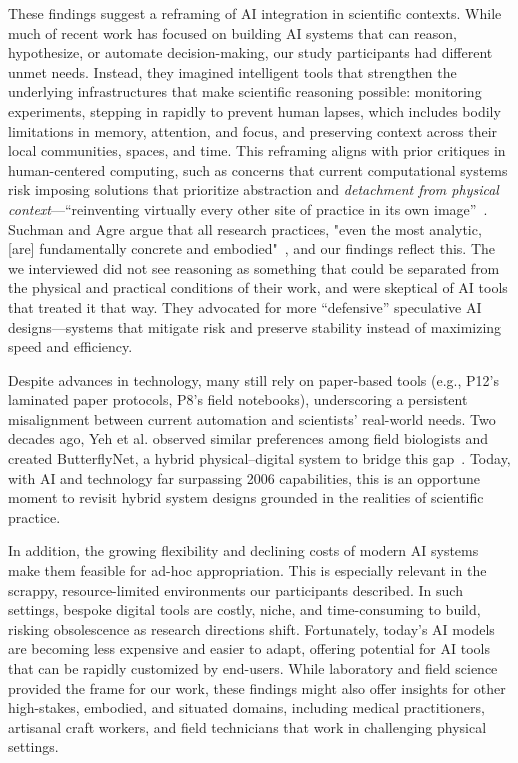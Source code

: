 These findings suggest a reframing of AI integration in scientific contexts. While much of recent work has focused on building AI systems that can reason, hypothesize, or automate decision-making, our study participants had different unmet needs. Instead, they imagined intelligent tools that strengthen the underlying infrastructures that make scientific reasoning possible: monitoring experiments, stepping in rapidly to prevent human lapses, which includes bodily limitations in memory, attention, and focus, and preserving context across their local communities, spaces, and time. This reframing aligns with prior critiques in human-centered computing, such as concerns that current computational systems risk imposing solutions that prioritize abstraction and \emph{detachment from physical context}---``reinventing virtually every other site of practice in its own image''~\cite{agre1997computation}. Suchman and Agre argue that all research practices, "even the most
analytic, [are] fundamentally concrete and embodied"~\cite{suchman1987plans}, and our findings reflect this. The  we interviewed did not see reasoning as something that could be separated from the physical and practical conditions of their work, and were skeptical of AI tools that treated it that way. They advocated for more ``defensive'' speculative AI designs---systems that mitigate risk and preserve stability instead of maximizing speed and efficiency.

Despite advances in technology, many  still rely on paper-based tools (e.g., P12’s laminated paper protocols, P8’s field notebooks), underscoring a persistent misalignment between current automation and scientists’ real-world needs. Two decades ago, Yeh et al. observed similar preferences among field biologists and created ButterflyNet, a hybrid physical–digital system to bridge this gap~\cite{yeh2006butterflynet}. Today, with AI and technology far surpassing 2006 capabilities, this is an opportune moment to revisit hybrid system designs grounded in the realities of scientific practice. 

In addition, the growing flexibility and declining costs of modern AI systems make them feasible for ad-hoc appropriation. This is especially relevant in the scrappy, resource-limited environments our participants described. In such settings, bespoke digital tools are costly, niche, and time-consuming to build, risking obsolescence as research directions shift. Fortunately, today’s AI models are becoming less expensive and easier to adapt, offering potential for AI tools that can be rapidly customized by end-users. While laboratory and field science provided the frame for our work, these findings might also offer insights for other high-stakes, embodied, and situated domains, including medical practitioners, artisanal craft workers, and field technicians that work in challenging physical settings.



